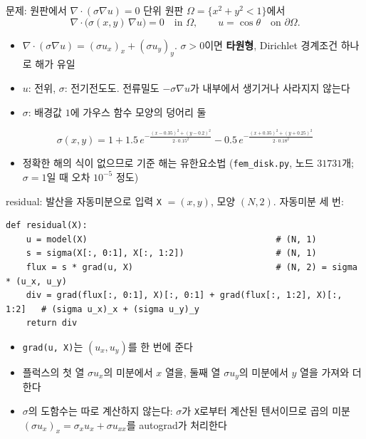 \documentclass[aspectratio=169,11pt]{beamer}
\begin{document}
\begin{frame}{문제: 원판에서 $\nabla\cdot(\sigma\nabla u)=0$}
단위 원판 $\Omega=\{x^2+y^2<1\}$에서
\[
\nabla\cdot\big(\sigma(x,y)\,\nabla u\big)=0\quad\text{in }\Omega,\qquad u=\cos\theta\quad\text{on }\partial\Omega.
\]
\begin{itemize}
\item $\nabla\cdot(\sigma\nabla u)=(\sigma u_x)_x+(\sigma u_y)_y$. $\sigma>0$이면 \textbf{타원형}, Dirichlet 경계조건 하나로 해가 유일
\item $u$: 전위, $\sigma$: 전기전도도. 전류밀도 $-\sigma\nabla u$가 내부에서 생기거나 사라지지 않는다
\item $\sigma$: 배경값 $1$에 가우스 함수 모양의 덩어리 둘
\end{itemize}
\[
\sigma(x,y)=1+1.5\,e^{-\frac{(x-0.35)^2+(y-0.2)^2}{2\cdot0.15^2}}-0.5\,e^{-\frac{(x+0.35)^2+(y+0.25)^2}{2\cdot0.18^2}}
\]
\begin{itemize}
\item 정확한 해의 식이 없으므로 기준 해는 유한요소법 (\texttt{fem\_disk.py}, 노드 $31731$개; $\sigma=1$일 때 오차 $10^{-5}$ 정도)
\end{itemize}
\end{frame}

\begin{frame}[fragile]{residual: 발산을 자동미분으로}
입력 \texttt{X} $=(x,y)$, 모양 $(N,2)$. 자동미분 세 번:
\begin{lstlisting}
def residual(X):
    u = model(X)                                     # (N, 1)
    s = sigma(X[:, 0:1], X[:, 1:2])                  # (N, 1)
    flux = s * grad(u, X)                            # (N, 2) = sigma * (u_x, u_y)
    div = grad(flux[:, 0:1], X)[:, 0:1] + grad(flux[:, 1:2], X)[:, 1:2]   # (sigma u_x)_x + (sigma u_y)_y
    return div
\end{lstlisting}
\begin{itemize}
\item \texttt{grad(u, X)}는 $(u_x,u_y)$를 한 번에 준다
\item 플럭스의 첫 열 $\sigma u_x$의 미분에서 $x$ 열을, 둘째 열 $\sigma u_y$의 미분에서 $y$ 열을 가져와 더한다
\item $\sigma$의 도함수는 따로 계산하지 않는다: $\sigma$가 \texttt{X}로부터 계산된 텐서이므로 곱의 미분 $(\sigma u_x)_x=\sigma_xu_x+\sigma u_{xx}$를 autograd가 처리한다
\end{itemize}
\end{frame}
\end{document}
